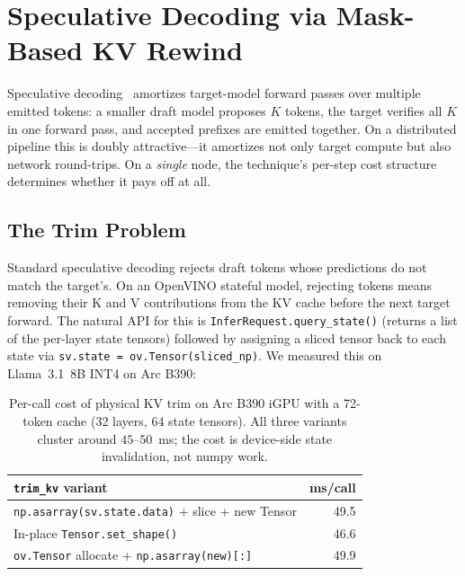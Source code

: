 \documentclass[11pt]{article}
\newcommand{\brk}{\discretionary{}{}{}}
\begin{document}
\section{Speculative Decoding via Mask-Based KV Rewind}
\label{sec:spec}

Speculative decoding~\cite{leviathan2023fast, chen2023accelerating} amortizes target-model forward passes over multiple emitted tokens: a smaller draft model proposes $K$ tokens, the target verifies all $K$ in one forward pass, and accepted prefixes are emitted together. On a distributed pipeline this is doubly attractive---it amortizes not only target compute but also network round-trips. On a \emph{single} node, the technique's per-step cost structure determines whether it pays off at all.

\subsection{The Trim Problem}

Standard speculative decoding rejects draft tokens whose predictions do not match the target's. On an OpenVINO stateful model, rejecting tokens means removing their K and V contributions from the KV cache before the next target forward. The natural API for this is \texttt{Infer\brk Request.\brk query\_state()} (returns a list of the per-layer state tensors) followed by assigning a sliced tensor back to each state via \texttt{sv.state = ov.Tensor(sliced\_np)}. We measured this on Llama~3.1~8B INT4 on Arc B390:

\begin{table}[ht]
\centering
\caption{Per-call cost of physical KV trim on Arc B390 iGPU with a 72-token cache (32 layers, 64 state tensors). All three variants cluster around $45$--$50$~ms; the cost is device-side state invalidation, not numpy work.}
\label{tab:trim_cost}
\begin{tabular}{@{}lr@{}}
\toprule
\texttt{trim\_kv} variant & ms/call \\
\midrule
\texttt{np.asarray(sv.state.data)} + slice + new Tensor & 49.5 \\
In-place \texttt{Tensor.set\_shape()} & 46.6 \\
\texttt{ov.Tensor} allocate + \texttt{np.asarray(new)[:]} & 49.9 \\
\bottomrule
\end{tabular}
\end{table}
\end{document}
